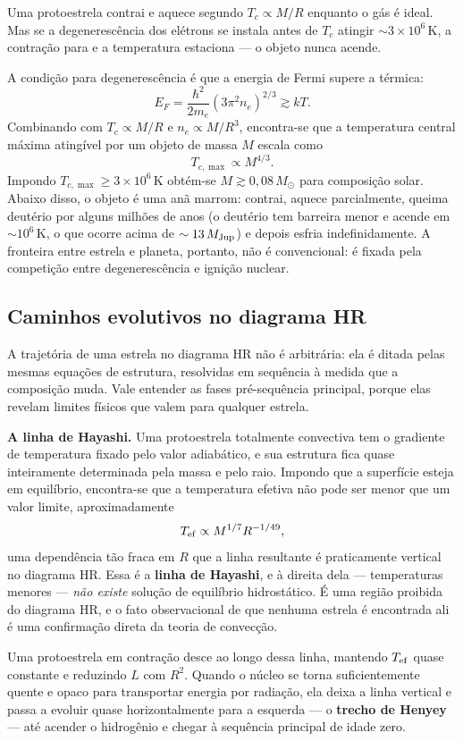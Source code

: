 \documentclass[11pt,a4paper]{article}
\begin{document}
Uma protoestrela contrai e aquece segundo $T_c\propto M/R$ enquanto o gás é ideal. Mas se a degenerescência dos elétrons se instala antes de $T_c$ atingir $\sim3\times10^{6}\,\mathrm{K}$, a contração para e a temperatura estaciona --- o objeto nunca acende.

A condição para degenerescência é que a energia de Fermi supere a térmica:
\[
E_F=\frac{\hbar^{2}}{2m_e}\left(3\pi^{2}n_e\right)^{2/3}\gtrsim kT.
\]
Combinando com $T_c\propto M/R$ e $n_e\propto M/R^{3}$, encontra-se que a temperatura central máxima atingível por um objeto de massa $M$ escala como
\[
T_{c,\max}\propto M^{4/3}.
\]
Impondo $T_{c,\max}\ge3\times10^{6}\,\mathrm{K}$ obtém-se $M\gtrsim0{,}08\,M_\odot$ para composição solar. Abaixo disso, o objeto é uma anã marrom: contrai, aquece parcialmente, queima deutério por alguns milhões de anos (o deutério tem barreira menor e acende em $\sim10^{6}\,\mathrm{K}$, o que ocorre acima de $\sim13\,M_{\rm Jup}$) e depois esfria indefinidamente. A fronteira entre estrela e planeta, portanto, não é convencional: é fixada pela competição entre degenerescência e ignição nuclear.

\subsection*{Caminhos evolutivos no diagrama HR}

A trajetória de uma estrela no diagrama HR não é arbitrária: ela é ditada pelas mesmas equações de estrutura, resolvidas em sequência à medida que a composição muda. Vale entender as fases pré-sequência principal, porque elas revelam limites físicos que valem para qualquer estrela.

\textbf{A linha de Hayashi.} Uma protoestrela totalmente convectiva tem o gradiente de temperatura fixado pelo valor adiabático, e sua estrutura fica quase inteiramente determinada pela massa e pelo raio. Impondo que a superfície esteja em equilíbrio, encontra-se que a temperatura efetiva não pode ser menor que um valor limite, aproximadamente
\[
T_{\rm ef}\propto M^{1/7}R^{-1/49},
\]
uma dependência tão fraca em $R$ que a linha resultante é praticamente vertical no diagrama HR. Essa é a \textbf{linha de Hayashi}, e à direita dela --- temperaturas menores --- \emph{não existe} solução de equilíbrio hidrostático. É uma região proibida do diagrama HR, e o fato observacional de que nenhuma estrela é encontrada ali é uma confirmação direta da teoria de convecção.

Uma protoestrela em contração desce ao longo dessa linha, mantendo $T_{\rm ef}$ quase constante e reduzindo $L$ com $R^{2}$. Quando o núcleo se torna suficientemente quente e opaco para transportar energia por radiação, ela deixa a linha vertical e passa a evoluir quase horizontalmente para a esquerda --- o \textbf{trecho de Henyey} --- até acender o hidrogênio e chegar à sequência principal de idade zero.
\end{document}

